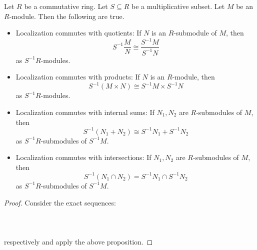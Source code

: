 \documentclass[a4paper]{article}
\begin{document}
\begin{crl}{}{} Let $R$ be a commutative ring. Let $S\subseteq R$ be a multiplicative subset. Let $M$ be an $R$-module. Then the following are true. 
\begin{itemize}
\item Localization commutes with quotients: If $N$ is an $R$-submodule of $M$, then $$S^{-1}\frac{M}{N}\cong\frac{S^{-1}M}{S^{-1}N}$$ as $S^{-1}R$-modules. 
\item Localization commutes with products: If $N$ is an $R$-module, then $$S^{-1}(M\times N)\cong S^{-1}M\times S^{-1}N$$ as $S^{-1}R$-modules. 
\item Localization commutes with internal sums: If $N_1,N_2$ are $R$-submodules of $M$, then $$S^{-1}(N_1+N_2)\cong S^{-1}N_1+S^{-1}N_2$$ as $S^{-1}R$-submodules of $S^{-1}M$. 
\item Localization commutes with intersections: If $N_1,N_2$ are $R$-submodules of $M$, then $$S^{-1}(N_1\cap N_2)=S^{-1}N_1\cap S^{-1}N_2$$ as $S^{-1}R$-submodules of $S^{-1}M$. 
\end{itemize} 
\begin{proof}
Consider the exact sequences: \\~\\
\\~\\
respectively and apply the above proposition. 
\end{proof}
\end{crl}
\end{document}
